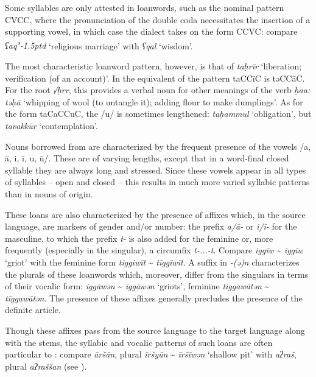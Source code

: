 \documentclass[output=paper]{langsci/langscibook}
\begin{document}
Some syllables are only attested in {loanwords}, such as the nominal pattern CVCC, where the pronunciation of the double {coda} necessitates the insertion of a supporting vowel, in which case the dialect takes on the form CCVC: compare \textit{ʕaq\kern 0.5pt\textsuperscript{ə}\kern -1.5ptd} ‘religious marriage’ with \textit{ʕqal} ‘wisdom’.

The most characteristic {loanword} pattern, however, is that of \textit{taḥrīr} ‘liberation; verification (of an account)’. In  the equivalent of the pattern taCCīC is təCCāC. For the {root} \textit{√ḥrr}, this provides a verbal noun for other meanings of the verb \textit{ḥa{\R}{\R}a{\R}:} \textit{təḥ{\R}ā{\R}} ‘whipping of wool (to untangle it); adding flour to make dumplings’. As for the form taCaCCuC, the /u/ is sometimes lengthened: \textit{taḥammul} ‘obligation’, but \textit{tavakkūr} ‘contemplation’.


Nouns borrowed from  are characterized by the frequent presence of the vowels /a, ā, i, ī, u, ū/. These are of varying lengths, except that in a word-final closed syllable they are always long and stressed. Since these vowels appear in all types of syllables – open and closed – this results in much more varied syllabic patterns than in nouns of  origin. 

These loans are also characterized by the presence of affixes which, in the {source language}, are markers of {gender} and/or number: the prefix \textit{a/ā-} or \textit{i/ī-} for the masculine, to which the prefix \textit{t-} is also added for the feminine or, more frequently (especially in the singular), a circumfix \textit{t-...-t}. Compare \textit{iggīw} \~{} \textit{īggīw} ‘griot’ with the feminine form \textit{tiggiwīt} \~{} \textit{tīggīwīt}. A suffix in \textit{-(ə)n} characterizes the plurals of these {loanwords} which, moreover, differ from the singulars in terms of their vocalic form: \textit{iggāwən} \~{} \textit{īggāwən} ‘griots’, feminine \textit{tiggawātən} \~{} \textit{tīggawātən}. The presence of these affixes generally precludes the presence of the {definite} {article}.

Though these affixes pass from the {source language} to the target language along with the stems, the syllabic and vocalic patterns of such loans are often particular to : compare  \textit{āršān}, plural \textit{īršyūn} \~{} \textit{īršīwən} ‘shallow pit’ with  \textit{aʔraš}, plural \textit{aʔraššan} (see \citealt{Taine-Cheikh1997Zenaga}).
\end{document}
